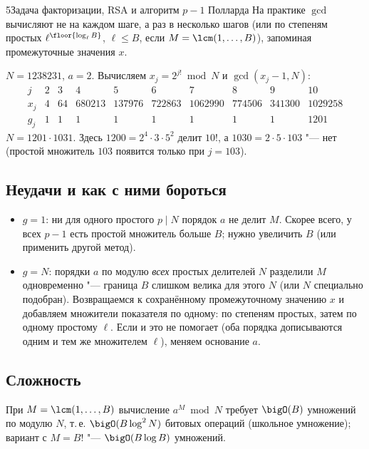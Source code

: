 \begin{lecture}{5}{Задача факторизации, RSA и алгоритм \texorpdfstring{$p - 1$}{p - 1} Полларда}
На практике $\gcd$ вычисляют не на каждом шаге, а раз в несколько шагов (или по степеням
простых $\ell^{\floor{\log_\ell B}}$, $\ell \le B$, если $M = \lcm(1, \dots, B)$), запоминая
промежуточные значения $x$.

\begin{example}
$N = 1238231$, $a = 2$. Вычисляем $x_j = 2^{j!} \bmod N$ и $\gcd(x_j - 1, N)$:
\[
\begin{array}{c|rrrrrrrrr}
  j & 2 & 3 & 4 & 5 & 6 & 7 & 8 & 9 & 10\\ \hline
  x_j & 4 & 64 & 680213 & 137976 & 722863 & 1062990 & 774506 & 341300 & 1029258\\
  g_j & 1 & 1 & 1 & 1 & 1 & 1 & 1 & 1 & 1201
\end{array}
\]
$N = 1201 \cdot 1031$. Здесь $1200 = 2^4 \cdot 3 \cdot 5^2$ делит $10!$, а
$1030 = 2 \cdot 5 \cdot 103$ "--- нет (простой множитель $103$ появится только при $j = 103$).
\end{example}


\subsection{Неудачи и как с ними бороться}

\begin{itemize}
  \item $g = 1$: ни для одного простого $p \mid N$ порядок $a$ не делит $M$. Скорее всего,
    у всех $p - 1$ есть простой множитель больше $B$; нужно увеличить $B$ (или применить
    другой метод).
  \item $g = N$: порядки $a$ по модулю \emph{всех} простых делителей $N$ разделили $M$
    одновременно "--- граница $B$ слишком велика для этого $N$ (или $N$ специально
    подобран). Возвращаемся к сохранённому промежуточному значению $x$ и добавляем
    множители показателя по одному: по степеням простых, затем по одному простому $\ell$.
    Если и это не помогает (оба порядка дописываются одним и тем же множителем $\ell$),
    меняем основание $a$.
\end{itemize}


\subsection{Сложность}

\begin{proposition}\label{l5:pm1-cost}
При $M = \lcm(1, \dots, B)$ вычисление $a^M \bmod N$ требует $\bigO(B)$ умножений по модулю
$N$, т.\,е. $\bigO(B \log^2 N)$ битовых операций (школьное умножение); вариант с $M = B!$ "---
$\bigO(B \log B)$ умножений.
\end{proposition}


\end{lecture}
